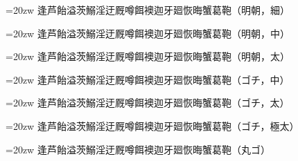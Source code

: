 \documentclass[uplatex]{jsarticle}
\begin{document}
\def\R{\par\noindent%
  \vbox{\LARGE\hsize=20zw\noindent\kanjiskip=0pt
  逢芦飴溢茨鰯淫迂厩噂餌襖迦牙廻恢晦蟹葛鞄}}

\selectfont \R（明朝，細）
\selectfont \R（明朝，中）
\selectfont \R（明朝，太）
\selectfont \R（ゴチ，中）
\selectfont \R（ゴチ，太）
\selectfont \R（ゴチ，極太）
\selectfont \R（丸ゴ）
\end{document}
